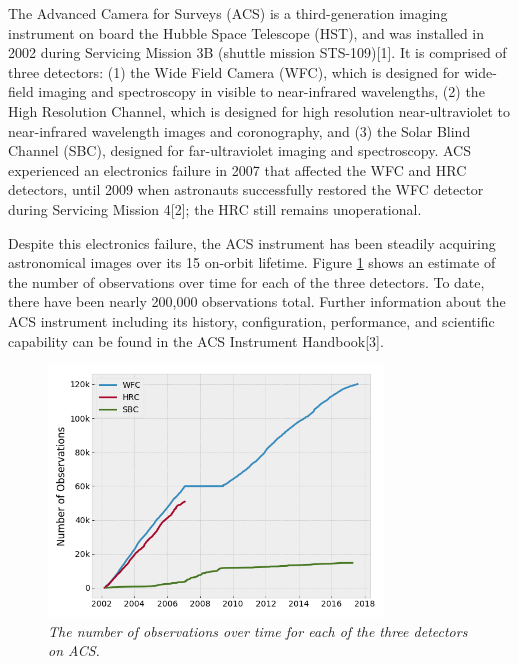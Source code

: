 \documentclass[10pt,journal,compsoc]{IEEEtran}
\begin{document}
The Advanced Camera for Surveys (ACS) is a third-generation imaging instrument on board the Hubble Space Telescope (HST), and was
installed in 2002 during Servicing Mission 3B (shuttle mission STS-109)[1]. It is comprised of three detectors: (1) the Wide Field Camera
(WFC), which is designed for wide-field imaging and spectroscopy in visible to near-infrared wavelengths, (2) the High Resolution Channel,
which is designed for high resolution near-ultraviolet to near-infrared wavelength images and coronography, and (3) the Solar Blind
Channel (SBC), designed for far-ultraviolet imaging and spectroscopy.  ACS experienced an electronics failure in 2007 that affected
the WFC and HRC detectors, until 2009 when astronauts successfully restored the WFC detector during Servicing Mission 4[2]; the HRC still
remains unoperational.

Despite this electronics failure, the ACS instrument has been steadily acquiring astronomical images over its 15 on-orbit lifetime.
Figure \ref{fig1} shows an estimate of the number of observations over time for each of the three detectors.  To date, there have been
nearly 200,000 observations total.  Further information about the ACS instrument including its history, configuration, performance, and
scientific capability can be found in the ACS Instrument Handbook[3].

\begin{figure}[!t]
\centering
\includegraphics[width=3.5in]{./figures/num_obs.png}
\caption{\textit{The number of observations over time for each of the three detectors on ACS.}}
\label{fig1}
\end{figure}
\end{document}
